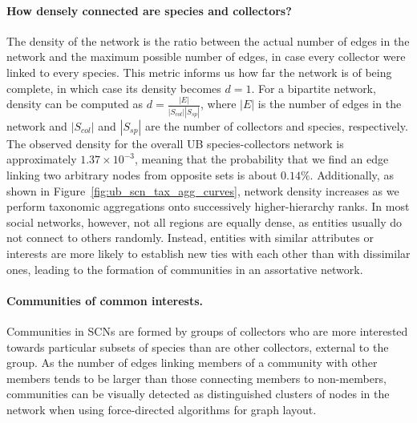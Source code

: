\paragraph{How densely connected are species and collectors?}
The density of the network is the ratio between the actual number of edges in the network and the maximum possible number of edges, in case every collector were linked to every species. This metric informs us how far the network is of being complete, in which case its density becomes $d=1$. For a bipartite network, density can be computed as $d = \frac{|E|}{|S_{col}| |S_{sp}|}$, where $|E|$ is the number of edges in the network and $|S_{col}|$ and $|S_{sp}|$ are the number of collectors and species, respectively.
%
The observed density for the overall UB species-collectors network is approximately $1.37 \times 10^{-3}$, meaning that the probability that we find an edge linking two arbitrary nodes from opposite sets is about $0.14\%$. Additionally, as shown in Figure~\ref{fig:ub_scn_tax_agg_curves}, network density increases as we perform taxonomic aggregations onto successively higher-hierarchy ranks.
%
In most social networks, however, not all regions are equally dense, as entities usually do not connect to others randomly. Instead, entities with similar attributes or interests are more likely to establish new ties with each other than with dissimilar ones, leading to the formation of communities in an assortative network.

\paragraph{Communities of common interests.}
Communities in SCNs are formed by groups of collectors who are more interested towards particular subsets of species than are other collectors, external to the group.
As the number of edges linking members of a community with other members tends to be larger than those connecting members to non-members, communities can be visually detected as distinguished clusters of nodes in the network when using force-directed algorithms \cite{Jacomy2014} for graph layout.

